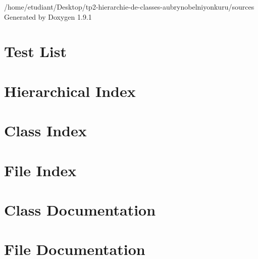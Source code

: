 \let\mypdfximage\pdfximage\def\pdfximage{\immediate\mypdfximage}\documentclass[twoside]{book}
\newcommand{\+}{\discretionary{\mbox{\scriptsize$\hookleftarrow$}}{}{}}
\newcommand{\clearemptydoublepage}{%
  \newpage{\pagestyle{empty}\cleardoublepage}%
}
\begin{document}
\raggedbottom

\hypersetup{pageanchor=false,
             bookmarksnumbered=true,
             pdfencoding=unicode
            }
\begin{titlepage}
\vspace*{7cm}
\begin{center}%
{\Large /home/etudiant/\+Desktop/tp2-\/hierarchie-\/de-\/classes-\/aubrynobelniyonkuru/sources }\\
\vspace*{1cm}
{\large Generated by Doxygen 1.9.1}\\
\end{center}
\end{titlepage}
\clearemptydoublepage
{}
\tableofcontents
\clearemptydoublepage
{}
\hypersetup{pageanchor=true}

\chapter{Test List}
\label{test}

\chapter{Hierarchical Index}

\chapter{Class Index}

\chapter{File Index}

\chapter{Class Documentation}















\chapter{File Documentation}















\backmatter
\newpage
{}
\clearemptydoublepage
{}
\printindex
\end{document}
